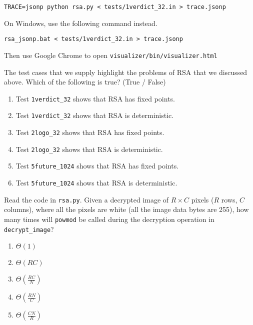 \documentclass[12pt,twoside]{article}
\begin{document}
\begin{problems}
\texttt{TRACE=jsonp python rsa.py < tests/1verdict\_32.in > trace.jsonp}

On Windows, use the following command instead.

\texttt{rsa\_jsonp.bat < tests/1verdict\_32.in > trace.jsonp}

Then use Google Chrome to open
\texttt{visualizer/bin/visualizer.html}

\begin{problemparts}
\problempart {} The test cases that we supply highlight the problems of
RSA that we discussed above. Which of the following is true? (True / False)
\begin{enumerate}
  \item Test \texttt{1verdict\_32} shows that RSA has fixed points.
  \item Test \texttt{1verdict\_32} shows that RSA is deterministic.
  \item Test \texttt{2logo\_32} shows that RSA has fixed points.
  \item Test \texttt{2logo\_32} shows that RSA is deterministic.
  \item Test \texttt{5future\_1024} shows that RSA has fixed points.
  \item Test \texttt{5future\_1024} shows that RSA is deterministic.
\end{enumerate}

\problempart {} Read the code in \texttt{rsa.py}. Given a decrypted
image of $R \times C$ pixels ($R$ rows, $C$ columns), where all the pixels
are white (all the image data bytes are 255), how many times will
\texttt{powmod} be called during the decryption operation in
\texttt{decrypt\_image}?
\begin{enumerate}
  \item $\Theta(1)$
  \item $\Theta(R C)$
  \item $\Theta(\frac{RC}{N})$
  \item $\Theta(\frac{RN}{C})$
  \item $\Theta(\frac{CN}{R})$
\end{enumerate}


\end{problemparts}
\end{problems}
\end{document}
